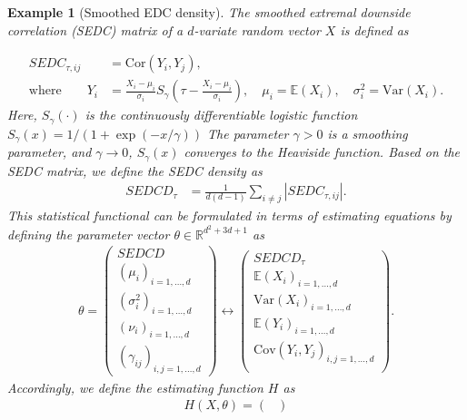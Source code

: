\documentclass[10pt, a4paper]{article}
\theoremstyle{assumption}
\newtheorem{example}{Example}[section]
\theoremstyle{definition}
\theoremstyle{theorem}
\newcommand{\R}{\mathbb{R}}
\newcommand{\E}{\mathbb{E}}
\begin{document}
\begin{example}[Smoothed EDC density]\label{ex:sedc}
    The smoothed extremal downside correlation (SEDC) matrix of a $d$-variate random vector $X$ is defined as 
    
    \begin{align*}
        SEDC_{\tau,ij} &= \mathrm{Cor}(Y_i, Y_j), \\
        \text{where}\qquad Y_i &= \frac{X_i-\mu_i}{\sigma_i} S_\gamma\left(\tau- \tfrac{X_i-\mu_i}{\sigma_i} \right),\quad
        \mu_i=\E(X_i),\quad \sigma_i^2=\mathrm{Var}(X_i).
    \end{align*}
    Here, $S_\gamma(\cdot)$ is the continuously differentiable logistic function $S_\gamma(x) = 1/(1 + \exp(-x/\gamma))$
    The parameter $\gamma > 0$ is a smoothing parameter, and $\gamma \rightarrow 0$, $S_\gamma(x)$ converges to the Heaviside function.
    Based on the SEDC matrix, we define the SEDC density as
    \begin{align*}
        SEDCD_\tau &= \frac{1}{d(d-1)}\sum_{i \neq j }|SEDC_{\tau,ij}|.
    \end{align*}
    This statistical functional can be formulated in terms of estimating equations by defining the parameter vector $\theta\in \R^{d^2 + 3d +1}$ as
    \begin{align*}
        \theta = \begin{pmatrix}
            SEDCD\\
            (\mu_i)_{i=1,\ldots,d} \\
            (\sigma_i^2)_{i=1,\ldots, d} \\
            (\nu_i)_{i=1,\ldots,d}\\
            (\gamma_{ij})_{i,j=1,\ldots, d}             
        \end{pmatrix} \leftrightarrow 
        \begin{pmatrix}
            SEDCD_\tau\\
            \E(X_i)_{i=1,\ldots, d}\\
            \mathrm{Var}(X_i)_{i=1,\ldots,d}\\
            \E(Y_i)_{i=1,\ldots, d}\\
            \mathrm{Cov}(Y_i, Y_j)_{i,j=1,\ldots, d} \\
        \end{pmatrix}.
    \end{align*}
    Accordingly, we define the estimating function $H$ as
    \begin{align*}
        H(X,\theta)= \begin{pmatrix}

\end{pmatrix}
\end{align*}
\end{example}
\end{document}

